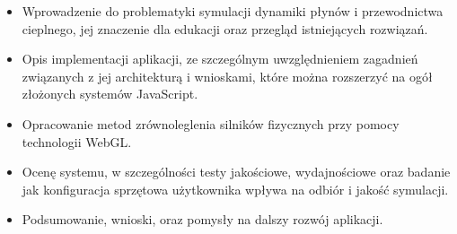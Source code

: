 \begin{itemize}

\item Wprowadzenie do problematyki symulacji dynamiki płynów i przewodnictwa cieplnego, jej
znaczenie dla edukacji oraz przegląd istniejących rozwiązań.

\item Opis implementacji aplikacji, ze szczególnym uwzględnieniem zagadnień związanych z jej
architekturą i wnioskami, które można rozszerzyć na ogół złożonych systemów JavaScript.

\item Opracowanie metod zrównoleglenia silników fizycznych przy pomocy technologii \mbox{WebGL}.

\item Ocenę systemu, w szczególności testy jakościowe, wydajnościowe oraz badanie jak konfiguracja
sprzętowa użytkownika wpływa na odbiór i jakość symulacji.

\item Podsumowanie, wnioski, oraz pomysły na dalszy rozwój aplikacji.

\end{itemize}

